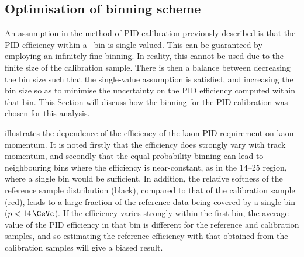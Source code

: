 \subsection{Optimisation of \texorpdfstring{\ptotetanspd}{(p, eta, Nspd)} binning scheme}
\label{chap:prod:effs:pid:binning}

An assumption in the method of \ac{PID} calibration previously described is 
that the \ac{PID} efficiency within a \ptotetanspd\ bin is single-valued.
This can be guaranteed by employing an infinitely fine binning.
In reality, this cannot be used due to the finite size of the calibration 
sample.
There is then a balance between decreasing the bin size such that the 
single-value assumption is satisfied, and increasing the bin size so as to 
minimise the uncertainty on the \ac{PID} efficiency computed within that bin.
This Section will discuss how the binning for the \ac{PID} calibration was 
chosen for this analysis.

 illustrates the 
dependence of the efficiency of the kaon \ac{PID} requirement on kaon momentum.
It is noted firstly that the efficiency does strongly vary with track momentum, 
and secondly that the equal-probability binning can lead to neighbouring bins 
where the efficiency is near-constant, as in the 14--\SI{25}{\GeVc} region, 
where a single bin would be sufficient.
In addition, the relative softness of the reference sample distribution 
(black), compared to that of the calibration sample (red), leads to a large 
fraction of the reference data being covered by a single bin ($p < 
\SI{14}{\GeVc}$).
If the efficiency varies strongly within the first bin, the average value of 
the \ac{PID} efficiency in that bin is different for the reference and 
calibration samples, and so estimating the reference efficiency with that 
obtained from the calibration samples will give a biased result.

